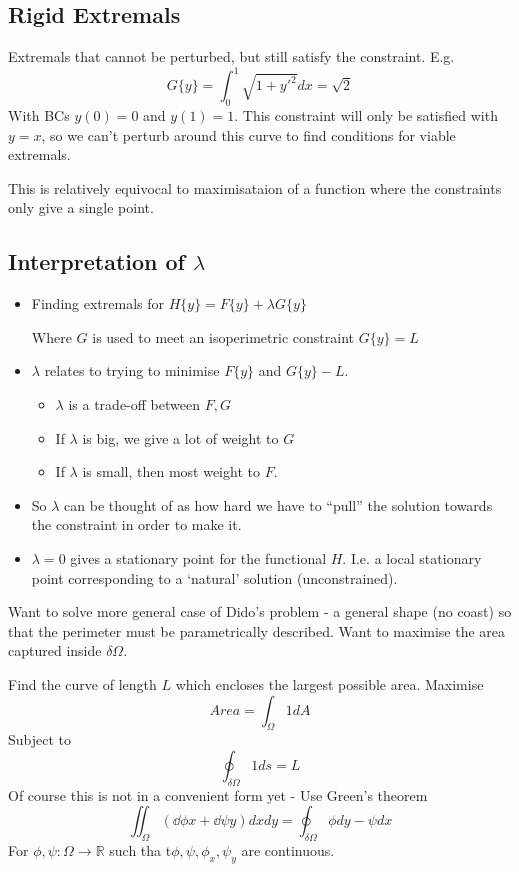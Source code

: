 \documentclass{X:/Documents/Coding/Latex/myassignment}
\begin{document}
\subsection{Rigid Extremals}
Extremals that cannot be perturbed, but still satisfy the constraint.
E.g.
\[G\{y\} = \int_0^1 \sqrt{1+y'^2} dx = \sqrt{2}\]
With BCs $y(0) = 0$ and $y(1) = 1$.
This constraint will only be satisfied with $y = x$, so we can't perturb around this curve to find conditions for viable extremals.

This is relatively equivocal to maximisataion of a function where the constraints only give a single point.



\subsection{Interpretation of $\lambda$}
\begin{itemize}
	\item Finding extremals for $H\{y\} = F\{y\} + \lambda G\{y\}$

	Where $G$ is used to meet an isoperimetric constraint $G\{y\} = L$
	\item $\lambda$ relates to trying to minimise $F\{y\}$ and $G\{y\} - L$.
	\begin{itemize}
		\item $\lambda$ is a trade-off between $F,G$
		\item If $\lambda$ is big, we give a lot of weight to $G$
		\item If $\lambda$ is small, then most weight to $F$.
	\end{itemize}
	\item So $\lambda$ can be thought of as how hard we have to ``pull'' the solution towards the constraint in order to make it.
	\item $\lambda = 0$ gives a stationary point for the functional $H$. I.e. a local stationary point corresponding to a `natural' solution (unconstrained).
\end{itemize}

Want to solve more general case of Dido's problem - a general shape (no coast) so that the perimeter must be parametrically described. Want to maximise the area captured inside $\delta\Omega$.

Find the curve of length $L$ which encloses the largest possible area. Maximise
\[Area = \int_{\Omega} 1 dA\]
Subject to
\[\oint_{\delta\Omega} 1 ds = L\]
Of course this is not in a convenient form yet - 
Use Green's theorem
\[\iint_{\Omega} \left(\dd\phi x + \dd\psi y\right) dx dy = \oint_{\delta\Omega} \phi dy - \psi dx\]
For $\phi,\psi : \Omega \to \mathbb{R}$ such tha t$\phi,\psi,\phi_x, \psi_y$ are continuous.
\end{document}
